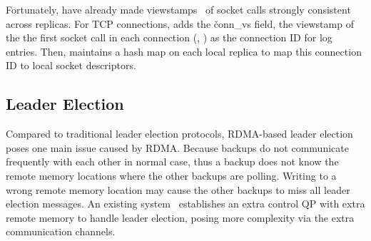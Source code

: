 Fortunately, \paxos have already made viewstamps~\cite{paxos:practical} of 
socket calls strongly consistent across replicas. For TCP connections, \xxx 
adds the \v{conn\_vs} field, the viewstamp of the the first socket call in 
each connection (\ie, \accept) as the connection ID for log entries. Then, \xxx 
maintains a hash map on each local replica to map this connection ID to local 
socket descriptors.







\subsection{Leader Election} \label{sec:election}


Compared to traditional \paxos leader election protocols, RDMA-based 
leader election poses one main issue caused by RDMA. Because backups do not 
communicate frequently with each other in normal case, thus a backup does not 
know the remote memory locations where the other backups are polling. Writing to 
a wrong remote memory location may cause the other backups to miss all leader 
election messages. An existing system~\cite{dare:hpdc15} establishes an extra 
control QP with extra remote memory to handle leader election, posing more
complexity via the extra communication channels.


